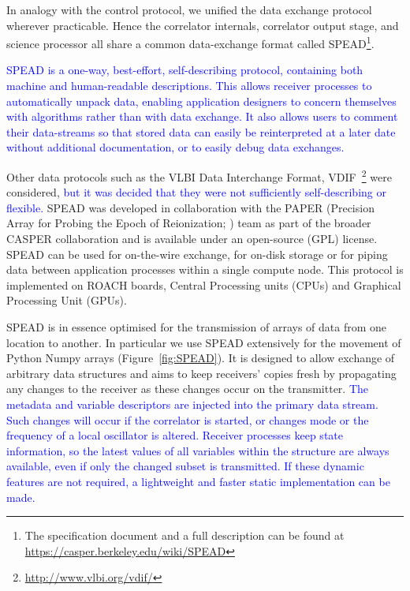 \noindent
In analogy with the control protocol, we unified the data exchange
protocol wherever practicable. Hence the correlator internals,
correlator output stage, and science processor all share a common
data-exchange format called
SPEAD\footnote{The specification document and a full description can
be found at \url{https://casper.berkeley.edu/wiki/SPEAD}}. 


\textcolor{blue}{
SPEAD is a one-way, best-effort, self-describing protocol, containing
both machine and human-readable descriptions. This allows receiver
processes to automatically unpack data, enabling application designers
to concern themselves with algorithms rather than with data
exchange. It also allows users to comment their data-streams so that
stored data can easily be reinterpreted at a later date without
additional documentation, or to easily debug data exchanges.}

Other data protocols such as the VLBI Data Interchange Format, 
VDIF~\footnote{\url{http://www.vlbi.org/vdif/}} were considered, 
\textcolor{blue}{but it was decided
that they were not sufficiently self-describing or flexible.
}
SPEAD was
developed in collaboration with the PAPER (Precision Array for Probing
the Epoch of Reionization; \citealt{parsons}) team as part of the
broader CASPER collaboration and is available under an open-source
(GPL) license. SPEAD can be used for on-the-wire exchange, for on-disk
storage or for piping data between application processes within a
single compute node. 
This protocol is implemented on ROACH boards, Central Processing
units (CPUs) and Graphical Processing Unit (GPUs).

SPEAD is in essence optimised for the transmission of arrays of data
from one location to another. In particular we use SPEAD extensively
for the movement of Python Numpy arrays (Figure~\ref{fig:SPEAD}).  It
is designed to allow exchange of arbitrary data structures and aims to keep
receivers' copies fresh by propagating any changes
to the receiver as these changes occur on the transmitter.
\textcolor{blue}{
The metadata and variable descriptors are injected into the primary data stream.
Such changes will occur if the correlator is started, or changes mode
or the frequency of a local oscillator is altered.
Receiver processes keep state information, so
the latest values of all variables within the structure are always
available, even if only the changed subset is transmitted.
If these dynamic features are not required, a lightweight and faster
static implementation can be made.}

